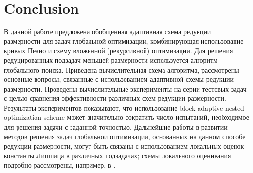 \documentclass[runningheads]{llncs}
\begin{document}
\section{Conclusion}
\Russian
В данной работе предложена обобщенная адаптивная схема редукции размерности для задач глобальной оптимизации, комбинирующая использование кривых Пеано и схему вложенной (рекурсивной) оптимизации. Для решения редуцированных подзадач меньшей размерности используется алгоритм глобального поиска. Приведена вычислительная схема алгоритма, рассмотрены основные вопросы, связанные с использованием адаптивной схемы редукции размерности.
Проведены вычислительные эксперименты на серии тестовых задач с целью сравнения эффективности различных схем редукции размерности. 
Результаты экспериментов показывают, что использование block adaptive nested optimization scheme может значительно сократить число испытаний, необходимое для решения задачи с заданной точностью. 
Дальнейшие работы в развитии методов решения задач глобальной оптимизации, основанных на данном способе редукции размерности, могут быть связаны с использованием локальных оценок константы Липшица в различных подзадачах; схемы локального оценивания подробно рассмотрены, например, в \cite{Grishagin2015,Sergeyev2016}.


%
%
%
 
 
\end{document}
